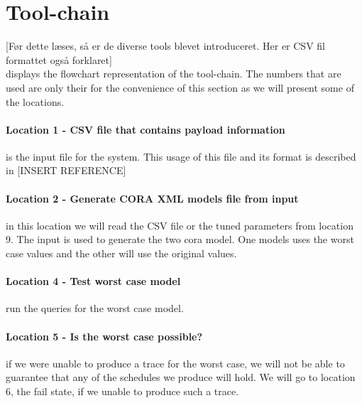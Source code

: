 \section{Tool-chain} \label{sec:tool_chain}
[Før dette læses, så er de diverse tools blevet introduceret. Her er CSV fil formattet også forklaret]\\
 displays the flowchart representation of the tool-chain. The numbers that are used are only their for the convenience of this section as we will present some of the locations. 

\paragraph{Location 1 - CSV file that contains payload information} is the input file for the system. This usage of this file and its format is described in [INSERT REFERENCE]

\paragraph{Location 2 - Generate CORA XML models file from input} in this location we will read the CSV file or the tuned parameters from location 9. The input is used to generate the two \gls{cora} model. One models uses the worst case values and the other will use the original values. 


\paragraph{Location 4 - Test worst case model} run the queries for the worst case model.

\paragraph{Location 5 - Is the worst case possible?} if we were unable to produce a trace for the worst case, we will not be able to guarantee that any of the schedules we produce will hold. We will go to location 6, the fail state, if we unable to produce such a trace.

